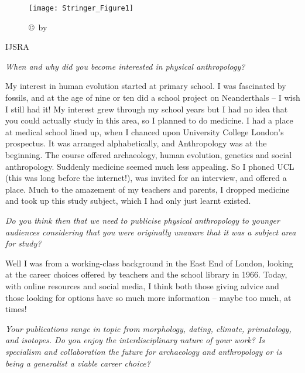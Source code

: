 \documentclass{ijsra}
\begin{document}
\IJSRAopening

\begin{figure}[!htb] %
	\centering
	\texttt{[image: Stringer\_Figure1]}
	\caption{
	{\normalfont\scriptsize \copyright\ by
                  }}
	\label{fig:Stringer_Figure1}
\end{figure}

\begin{labeling}{IJSRA}	
\item[IJSRA (International Journal of Student Research in Archaeology)] 
\emph{When and why did you become interested in physical anthropology?}
	
\item[Prof. Chris Stringer (CS)] 
My interest in human evolution started at primary school.
I was fascinated by fossils, and at the age of nine or ten did a school project on Neanderthals – I wish I still had it!
My interest grew through my school years but I had no idea that you could actually study in this area, so I planned to do medicine.
I had a place at medical school lined up, when I chanced upon University College London’s prospectus.
It was arranged alphabetically, and Anthropology was at the beginning.
The course offered archaeology, human evolution, genetics and social anthropology.
Suddenly medicine seemed much less appealing.
So I phoned UCL (this was long before the internet!), was invited for an interview, and offered a place.
Much to the amazement of my teachers and parents, I dropped medicine and took up this study subject,
which I had only just learnt existed.

\item[IJSRA] 
\emph{Do you think then that we need to publicise physical anthropology to younger audiences considering that you were
originally unaware that it was a subject area for study?}
	
\item[CS] 
Well I was from a working-class background in the East End of London, looking at the career choices offered by
teachers and the school library in 1966. Today, with online resources and social media,
I think both those giving advice and those looking for options have so much more information – maybe too much, at times!

\item[IJSRA]
\emph{Your publications range in topic from morphology, dating, climate, primatology, and isotopes.
Do you enjoy the interdisciplinary nature of your work? 
Is specialism and collaboration the future for archaeology and anthropology or is being a generalist a viable career choice?}


\end{labeling}
\end{document}
